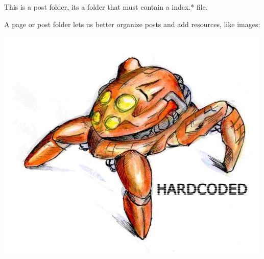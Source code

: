 \documentclass{article}
\begin{document}
This is a post folder, its a folder that must contain a index.* file.

A page or post folder lets us better organize posts and add resources, like images:

\includegraphics{sources/posts/A post folder/hardcoded83_mascote_by_chojin_83.png}
\end{document}
